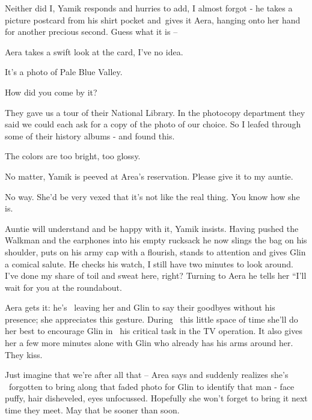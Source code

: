 \documentclass[12pt]{book}
\begin{document}
{\textquotedbl}Neither did I,{\textquotedbl} Yamik responds and hurries to add, {\textquotedbl}I almost forgot
-{\textquotedbl} he takes a picture postcard from his shirt pocket and~gives it Aera, hanging onto her hand for another
precious second. {\textquotedbl}Guess what it is --{\textquotedbl}

Aera takes a swift look at{ }the card, {\textquotedbl}I've no idea.{\textquotedbl}

{\textquotedbl}It's a photo of Pale Blue Valley.{\textquotedbl}

{\textquotedbl}How did you come by it?{\textquotedbl}

{\textquotedbl}They gave us a tour of their National Library. In the photocopy department they said we could each ask
for a copy of the photo of our choice. So I leafed through some of their history albums - and found
this.{\textquotedbl}

{\textquotedbl}The colors are too bright, too glossy.{\textquotedbl}

{\textquotedbl}No matter,{\textquotedbl} Yamik is peeved at Area's reservation. {\textquotedbl}Please give it to my
auntie.{\textquotedbl}

{\textquotedbl}No way. She'd be very vexed that it's not like the real thing. You know how she is.{\textquotedbl}

{\textquotedbl}Auntie will understand and be happy with it,{\textquotedbl} Yamik insists. Having pushed the Walkman and
the earphones into his empty rucksack he now slings the bag on his shoulder, puts on his army cap with a flourish,
stands to attention and gives Glin a comical salute. He checks his watch, {\textquotedbl}I still have two minutes to
look around. I've done my share of toil and sweat here, right?{\textquotedbl} Turning to Aera he tells her ``I'll wait
for you at the roundabout.{\textquotedbl}

Aera gets it: he's \ leaving her and Glin to say their goodbyes without his presence; she appreciates this gesture.
During \ this little space of time she'll do her best to encourage Glin in \ his critical task in the TV operation. It
also gives her a few more minutes alone with Glin who already has his arms around her. They kiss.

{\textquotedbl}Just imagine that we're after all that --{\textquotedbl} Area says and suddenly realizes she's
\ forgotten to bring along that faded photo for Glin to identify that man - face puffy, hair disheveled, eyes
unfocussed. Hopefully she won't forget to bring it next time they meet. May that be sooner than soon.
\end{document}
